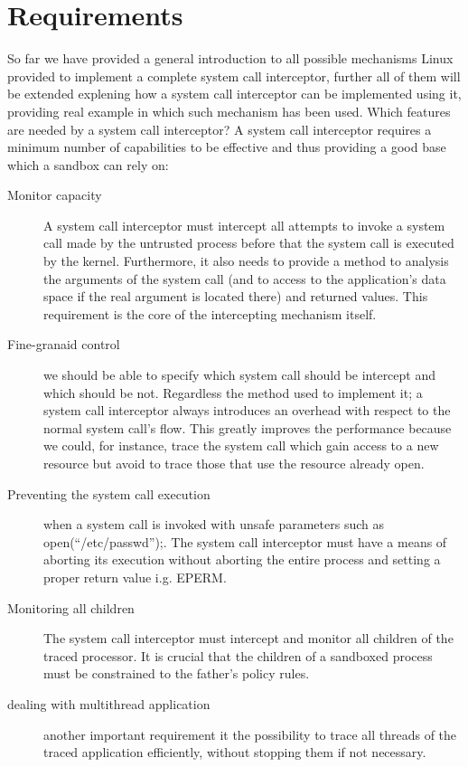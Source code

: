 \section{Requirements}
So far we have provided a general introduction to all possible mechanisms Linux provided to implement a complete system call interceptor, further all of them will be extended explening how a system call interceptor can be implemented using it, providing real example in which such mechanism has been used.
Which features are needed by a system call interceptor?
A system call interceptor requires a minimum number of capabilities to be effective and thus providing a good base which a sandbox can rely on:
\begin{description}

\item[Monitor capacity]
  A system call interceptor must intercept all attempts to invoke a system call made by the untrusted process before that the system call is executed by the kernel. Furthermore, it also needs to provide a method to analysis the arguments of the system call (and to access to the application’s data space if the real argument is located there) and returned values. This requirement is the core of the intercepting mechanism itself.  
\item[Fine-granaid control]
we should be able to specify which system call should be intercept and which should be not. Regardless the method used to implement it; a system call interceptor always introduces an overhead with respect to the normal system call’s flow. This greatly improves the performance because we could, for instance, trace the system call which gain access to a new resource but avoid to trace those that use the resource already open.    
\item[Preventing the system call execution]
when a system call is invoked with unsafe parameters such as open(“/etc/passwd”);. The system call interceptor must have a means of aborting its execution without aborting the entire process and setting a proper return value i.g. EPERM. 
\item[Monitoring all children]
 The system call interceptor must intercept and monitor all children of the traced processor. It is crucial that the children of a sandboxed process must be constrained to the father's policy rules.
\item[dealing with multithread application] another important requirement it the possibility to trace all threads of the traced application efficiently, without stopping them if not necessary. 
\end{description}

